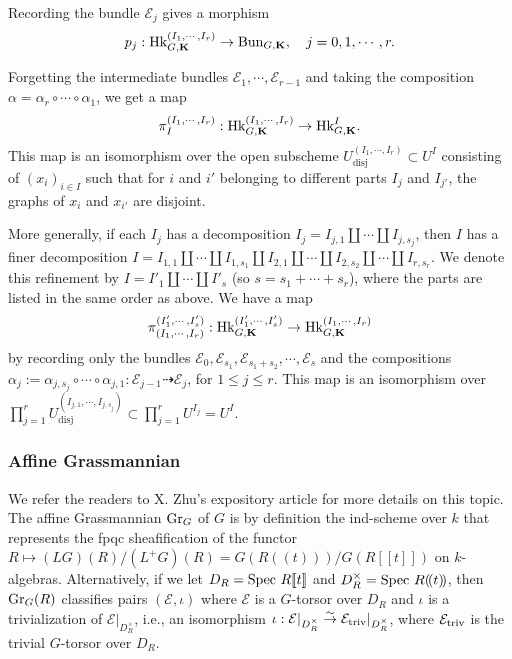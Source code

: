 \documentclass[11pt]{amsart}
\numberwithin{equation}{section}
\theoremstyle{plain}
\theoremstyle{definition}
\newcommand\cE{\mathcal{E}}
\def\bK{\mathbf{K}}
\newcommand{\Bun}{\textup{Bun}}
\newcommand{\Gr}{\textup{Gr}}
\newcommand{\Hk}{\textup{Hk}}
\newcommand\Spec{\textup{Spec}\ }
\newcommand\triv{\textup{triv}}
\newcommand{\isom}{\stackrel{\sim}{\to}}
\newcommand{\tl}[1]{[\![#1]\!]}
\newcommand{\lr}[1]{(\!(#1)\!)}
\newcommand\sss{\subsubsection}
\renewcommand\c\circ
\renewcommand\a\alpha
\newcommand{\io}{\iota}
\newcommand{\dr}{\dashrightarrow}
\newcommand{\disj}{\mathrm{disj}}
\begin{document}
Recording the bundle $\cE_{j}$ gives a morphism
\begin{equation*}
p_{j}: \Hk^{(I_{1},\cdots, I_{r})}_{G,\bK}\to \Bun_{G,\bK}, \quad j=0,1,\cdots, r.
\end{equation*}

Forgetting the intermediate bundles $\cE_{1},\cdots, \cE_{r-1}$ and taking the composition $\a=\a_{r}\c\cdots \c\a_{1}$, we get a map
\begin{equation*}
\pi^{(I_{1},\cdots, I_{r})}_{I}: \Hk^{(I_{1},\cdots, I_{r})}_{G,\bK}\to \Hk^{I}_{G,\bK}.
\end{equation*}
This map is an isomorphism over the open subscheme $U^{(I_{1},\cdots, I_{r})}_{\disj}\subset U^{I}$ consisting of $(x_{i})_{i\in I}$ such that for $i$ and $i'$ belonging to different parts $I_{j}$ and $I_{j'}$, the graphs of $x_{i}$ and $x_{i'}$ are disjoint.

More generally, if each $I_{j}$ has a decomposition $I_{j}=I_{j,1}\coprod \cdots\coprod I_{j,s_{j}}$, then $I$ has a finer decomposition $I=I_{1,1}\coprod \cdots\coprod I_{1,s_{1}}\coprod I_{2,1}\coprod\cdots\coprod I_{2,s_{2}}\coprod \cdots\coprod  I_{r,s_{r}}$. We denote this refinement by $I=I'_{1}\coprod \cdots\coprod I'_{s}$ (so $s=s_{1}+\cdots+s_{r}$), where the parts are listed in the same order as above. We have a map
\begin{equation*}
\pi^{(I'_{1},\cdots, I'_{s})}_{(I_{1},\cdots, I_{r})}: \Hk^{(I'_{1},\cdots, I'_{s})}_{G,\bK}\to \Hk^{(I_{1},\cdots, I_{r})}_{G,\bK}
\end{equation*}
by recording only the bundles $\cE_{0},\cE_{s_{1}},\cE_{s_{1}+s_{2}},\cdots, \cE_{s}$ and the compositions $\a_{j}:=\a_{j,s_{j}}\c\cdots\c\a_{j,1}: \cE_{j-1}\dr\cE_{j}$, for $1\le j\le r$. This map is an isomorphism over $\prod_{j=1}^{r}U^{(I_{j,1},\cdots, I_{j,s_{j}})}_{\disj}\subset \prod_{j=1}^{r}U^{I_{j}}=U^{I}$.



\sss{Affine Grassmannian}\label{sss:Gr} We refer the readers to X. Zhu's expository article \cite{Zhu-Satake} for more details on this topic. The affine Grassmannian $\Gr_{G}$ of $G$ is by definition the ind-scheme over $k$ that represents the fpqc sheafification of the functor $R\mapsto (LG)(R)/(L^{+}G)(R)=G(R\lr{t})/G(R\tl{t})$ on $k$-algebras. Alternatively, if we let $D_{R}=\Spec R\tl{t}$ and $D^{\times}_{R}=\Spec R\lr{t}$, then $\Gr_{G}(R)$ classifies pairs $(\cE, \io)$ where $\cE$ is a $G$-torsor over $D_{R}$ and $\io$ is a trivialization of $\cE|_{D^{\times}_{R}}$, i.e., an isomorphism $\io: \cE|_{D^{\times}_{R}}\isom \cE_{\triv}|_{D^{\times}_{R}}$, where $\cE_{\triv}$ is the trivial $G$-torsor over $D_{R}$.
\end{document}
